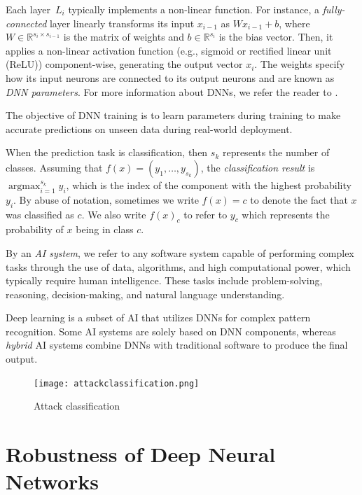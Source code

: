 Each layer~$L_i$ typically implements a non-linear function. For instance, a \emph{fully-connected} layer linearly transforms its input $x_{i-1}$ as $W x_{i-1} + b$, where $W\in\mathbb{R}^{s_{i} \times s_{i-1}}$ is the matrix of weights and $b\in\mathbb{R}^{s_i}$ is the bias vector. Then, it applies a non-linear activation function (e.g., sigmoid or rectified linear unit (ReLU)) component-wise, generating the output vector $x_i$. The weights specify how its input neurons are connected to its output neurons and are known as \emph{DNN parameters}. For more information about DNNs, we refer the reader to \cite{dnn_archi, Hassija, Liang}.

The objective of DNN training is to learn parameters during training to make accurate predictions on unseen data during real-world deployment.

When the prediction task is classification, then $s_k$ represents the number of classes. Assuming that $f(x) = (y_1,\dots,y_{s_k})$, the \emph{classification result} is $\displaystyle\mathop{\text{argmax}}_{i=1}^{s_k} y_i$, which is the index of the component with the highest probability $y_i$. By abuse of notation, sometimes we write $f(x)=c$ to denote the fact that $x$ was classified as $c$. We also write $f(x)_c$ to refer to $y_c$ which represents the probability of $x$ being in class $c$.

By an \emph{AI system}, we refer to any software system capable of performing complex tasks through the use of data, algorithms, and high computational power, which typically require human intelligence. These tasks include problem-solving, reasoning, decision-making, and natural language understanding.

Deep learning is a subset of AI that utilizes DNNs for complex pattern recognition. Some AI systems are solely based on DNN components, whereas \emph{hybrid} AI systems combine DNNs with traditional software to produce the final output.


\begin{figure}[h]
  \centering
  \texttt{[image: attackclassification.png]}
  \caption{Attack classification}
  \label{fig:adv_threats}
\end{figure}
\section{Robustness of Deep Neural Networks}


